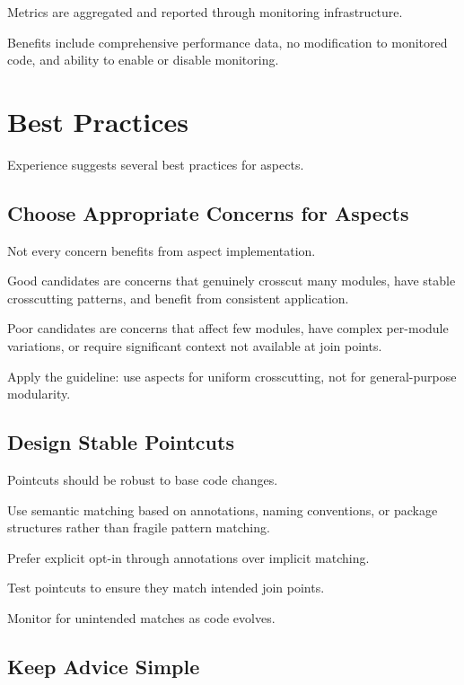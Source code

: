 \documentclass[11pt]{article}
\begin{document}
Metrics are aggregated and reported through monitoring infrastructure.

Benefits include comprehensive performance data, no modification to monitored code, and ability to enable or disable monitoring.

\section{Best Practices}

Experience suggests several best practices for aspects.

\subsection{Choose Appropriate Concerns for Aspects}

Not every concern benefits from aspect implementation.

Good candidates are concerns that genuinely crosscut many modules, have stable crosscutting patterns, and benefit from consistent application.

Poor candidates are concerns that affect few modules, have complex per-module variations, or require significant context not available at join points.

Apply the guideline: use aspects for uniform crosscutting, not for general-purpose modularity.

\subsection{Design Stable Pointcuts}

Pointcuts should be robust to base code changes.

Use semantic matching based on annotations, naming conventions, or package structures rather than fragile pattern matching.

Prefer explicit opt-in through annotations over implicit matching.

Test pointcuts to ensure they match intended join points.

Monitor for unintended matches as code evolves.

\subsection{Keep Advice Simple}
\end{document}
